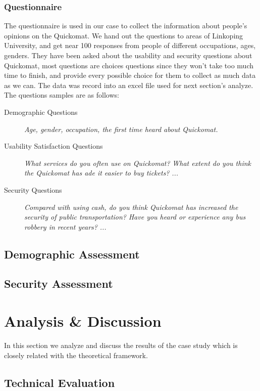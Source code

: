 \documentclass[twocolumn]{article}
\begin{document}
\subsubsection{Questionnaire}
The questionnaire is used in our case to collect the information about people’s opinions on the Quickomat. We hand out the questions to areas of Linkoping University, and get near 100 responses from people of different occupations, ages, genders. They have been asked about the usability and security questions about Quickomat, most questions are choices questions since they won’t take too much time to finish, and provide every possible choice for them to collect as much data as we can. The data was record into an excel file used for next section’s analyze. The questions samples are as follows:
\begin{description}
\item[Demographic Questions]
    \emph{Age, gender, occupation, the first time heard about Quickomat.}
\item[Usability Satisfaction Questions]
    \emph{What services do you often use on Quickomat?}
    \emph{What extent do you think the Quickomat has ade it easier to buy tickets?}
    \emph{...}
\item[Security Questions]
    \emph{Compared with using cash, do you think Quickomat has increased the security of public transportation?}
    \emph{Have you heard or experience any bus robbery in recent years?}
    \emph{...}
\end{description}

\subsection{Demographic Assessment}

\subsection{Security Assessment}

\section{Analysis \& Discussion}
In this section we analyze and discuss the results of the case study which is closely related with the theoretical framework.

\subsection{Technical Evaluation}
\end{document}
